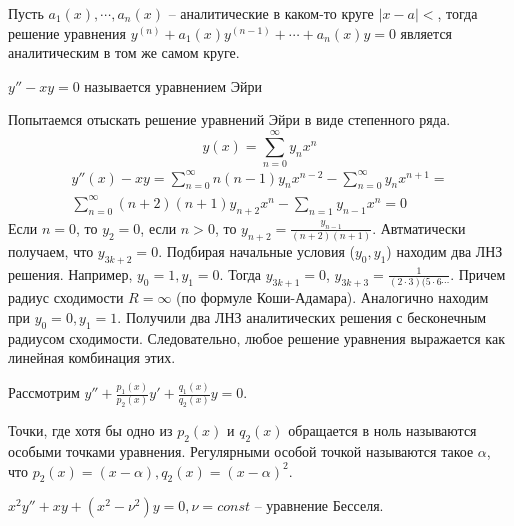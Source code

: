 \documentclass[document.tex]{subfiles}
\begin{document}
\begin{theorem}
    Пусть $a_1(x), \cdots, a_n(x)$ -- аналитические в каком-то круге $|x - a| < $, тогда решение уравнения $y^{(n)} +
    a_1(x) y^{(n - 1)} + \cdots + a_n(x) y = 0$ является аналитическим в том же самом круге.
\end{theorem}

\begin{definition}
    $y'' - xy = 0$ называется уравнением Эйри
\end{definition}

\begin{example}
    Попытаемся отыскать решение уравнений Эйри в виде степенного ряда.
    \[
        y(x) = \sum_{n = 0}^{\infty} y_n x^n
    \]
    \begin{multline*}
        y''(x) - xy = \sum_{n = 0}^{\infty} n(n - 1)y_n x^{n - 2} - \sum_{n = 0}^{\infty}y_n x^{n + 1} = \\
        \sum_{n = 0}^{\infty} (n+2)(n+1)y_{n+2} x^{n} - \sum_{n = 1} y_{n - 1} x^{n} = 0
    \end{multline*}
    Если $n = 0$, то $y_{2} = 0$, если $n > 0$, то $y_{n + 2} = \frac{y_{n - 1}}{(n + 2)(n + 1)}$. Автматически
    получаем, что $y_{3k + 2} = 0$. Подбирая начальные условия ($y_0, y_1$) находим два ЛНЗ решения. 
    Например, $y_0 = 1, y_1 = 0$. Тогда $y_{3k + 1} = 0$, $y_{3k + 3} = \frac{1}{(2 \cdot 3)(5 \cdot 6 \cdots}$. Причем
    радиус сходимости $R = \infty$ (по формуле Коши-Адамара). Аналогично находим при $y_0 = 0, y_1 = 1$. Получили два
    ЛНЗ аналитических решения с бесконечным радиусом сходимости. Следовательно, любое решение уравнения выражается как
    линейная комбинация этих.
\end{example}

Рассмотрим $y'' + \frac{p_1(x)}{p_2(x)}y' + \frac{q_1(x)}{q_2(x)}y = 0$.

\begin{definition}
    Точки, где хотя бы одно из $p_2(x)$ и $q_2(x)$ обращается в ноль называются особыми точками уравнения. Регулярными
    особой точкой называются такое $\alpha$, что $p_2(x) = (x - \alpha), q_2(x) = (x - \alpha)^2$.
\end{definition}

\begin{definition}
    $x^2y'' + xy + (x^2 - \nu^2)y = 0, \nu = const$ -- уравнение Бесселя.
\end{definition}
\end{document}
